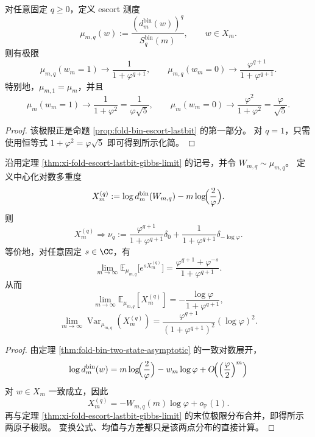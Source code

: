 \begin{theorem}\label{thm:xi-fold-escort-lastbit-gibbs-limit}
对任意固定 \(q\ge 0\)，定义 escort 测度
\[
\mu_{m,q}(w):=\frac{(d_m^{\mathrm{bin}}(w))^{q}}{S_q^{\mathrm{bin}}(m)},
\qquad
w\in X_m.
\]
则有极限
\[
\mu_{m,q}(w_m=1)\longrightarrow \frac{1}{1+\varphi^{q+1}},
\qquad
\mu_{m,q}(w_m=0)\longrightarrow \frac{\varphi^{q+1}}{1+\varphi^{q+1}}.
\]
特别地，\(\mu_{m,1}=\mu_m\)，并且
\[
\mu_m(w_m=1)\longrightarrow \frac{1}{1+\varphi^2}=\frac{1}{\varphi\sqrt5},
\qquad
\mu_m(w_m=0)\longrightarrow \frac{\varphi^2}{1+\varphi^2}=\frac{\varphi}{\sqrt5}.
\]
\end{theorem}
\begin{proof}
该极限正是命题 \ref{prop:fold-bin-escort-lastbit} 的第一部分。
对 \(q=1\)，只需使用恒等式 \(1+\varphi^2=\varphi\sqrt5\) 即可得到所示化简。
\end{proof}

\begin{theorem}\label{thm:xi-fold-escort-log-multiplicity-two-atom}
沿用定理 \ref{thm:xi-fold-escort-lastbit-gibbs-limit} 的记号，并令 \(W_{m,q}\sim\mu_{m,q}\)。
定义中心化对数多重度
\[
X_m^{(q)}:=\log d_m^{\mathrm{bin}}(W_{m,q})-m\log\!\Bigl(\frac{2}{\varphi}\Bigr).
\]
则
\[
X_m^{(q)}\Longrightarrow \nu_q
:=
\frac{\varphi^{q+1}}{1+\varphi^{q+1}}\delta_{0}
+\frac{1}{1+\varphi^{q+1}}\delta_{-\log\varphi}.
\]
等价地，对任意固定 \(s\in\CC\)，有
\[
\lim_{m\to\infty}\mathbb E_{\mu_{m,q}}\!\bigl[e^{sX_m^{(q)}}\bigr]
=
\frac{\varphi^{q+1}+\varphi^{-s}}{1+\varphi^{q+1}}.
\]
从而
\[
\lim_{m\to\infty}\mathbb E_{\mu_{m,q}}[X_m^{(q)}]
=-\frac{\log\varphi}{1+\varphi^{q+1}},
\]
\[
\lim_{m\to\infty}\operatorname{Var}_{\mu_{m,q}}(X_m^{(q)})
=
\frac{\varphi^{q+1}}{(1+\varphi^{q+1})^2}(\log\varphi)^2.
\]
\end{theorem}
\begin{proof}
由定理 \ref{thm:fold-bin-two-state-asymptotic} 的一致对数展开，
\[
\log d_m^{\mathrm{bin}}(w)
=
m\log\!\Bigl(\frac{2}{\varphi}\Bigr)-w_m\log\varphi+O\!\Bigl(\Bigl(\frac{\varphi}{2}\Bigr)^m\Bigr)
\]
对 \(w\in X_m\) 一致成立，因此
\[
X_m^{(q)}=-W_{m,q}(m)\log\varphi+o_{\mathbb P}(1).
\]
再与定理 \ref{thm:xi-fold-escort-lastbit-gibbs-limit} 的末位极限分布合并，即得所示两原子极限。
变换公式、均值与方差都只是该两点分布的直接计算。
\end{proof}

